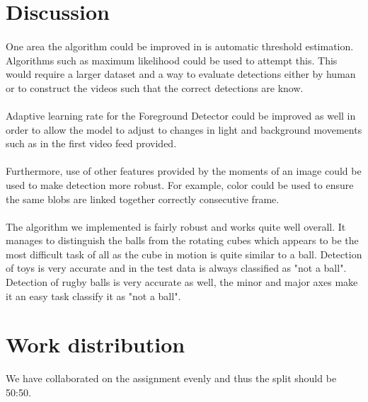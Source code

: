 \documentclass[10pt,a4paper]{article}
\begin{document}
\begin{multicols}{2}
\section{Discussion}

\paragraph{} One area the algorithm could be improved in is automatic threshold estimation. Algorithms such as maximum likelihood could be used to attempt this. This would require a larger dataset and a way to evaluate detections either by human or to construct the videos such that the correct detections are know.
\paragraph{} Adaptive learning rate for the Foreground Detector could be improved as well in order to allow the model to adjust to changes in light and background movements such as in the first video feed provided.
\paragraph{} Furthermore, use of other features provided by the moments of an image could be used to make detection more robust. For example, color could be used to ensure the same blobs are linked together correctly consecutive frame.
\paragraph{} The algorithm we  implemented is fairly robust and works quite well overall. It manages to distinguish the balls from the rotating cubes which appears to be the most difficult task of all as the cube in motion is quite similar to a ball. Detection of toys is very accurate and in the test data is always classified as "not a ball". Detection of rugby balls is very accurate as well, the minor and major axes make it an easy task classify it as "not a ball".

\section{Work distribution}

We have collaborated on the assignment evenly and thus the split should be 50:50.


\end{multicols}
\end{document}
